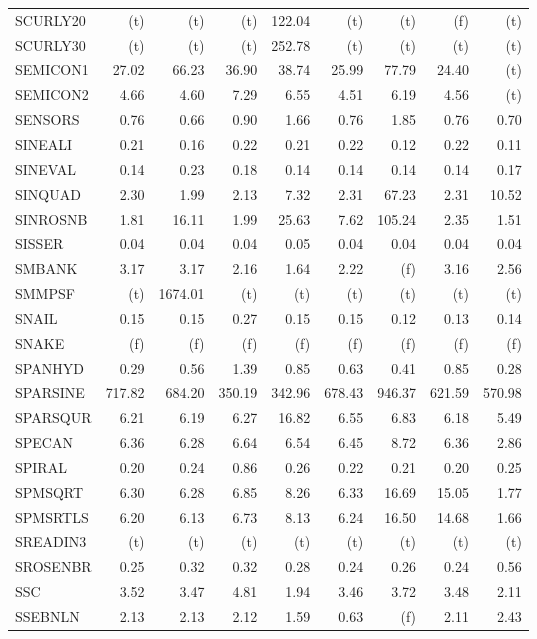 \documentclass[11pt,twoside]{article}
\begin{document}
{\begin{longtable}[c]{|l|r|r|r|r|r|r|r|r|}
SCURLY20 & (t) & (t) & (t) & 122.04 & (t) & (t) & (f) & (t) \\
SCURLY30 & (t) & (t) & (t) & 252.78 & (t) & (t) & (t) & (t) \\
SEMICON1 & 27.02 & 66.23 & 36.90 & 38.74 & 25.99 & 77.79 & 24.40 & (t) \\
SEMICON2 & 4.66 & 4.60 & 7.29 & 6.55 & 4.51 & 6.19 & 4.56 & (t) \\
SENSORS & 0.76 & 0.66 & 0.90 & 1.66 & 0.76 & 1.85 & 0.76 & 0.70 \\
SINEALI & 0.21 & 0.16 & 0.22 & 0.21 & 0.22 & 0.12 & 0.22 & 0.11 \\
SINEVAL & 0.14 & 0.23 & 0.18 & 0.14 & 0.14 & 0.14 & 0.14 & 0.17 \\
SINQUAD & 2.30 & 1.99 & 2.13 & 7.32 & 2.31 & 67.23 & 2.31 & 10.52 \\
SINROSNB & 1.81 & 16.11 & 1.99 & 25.63 & 7.62 & 105.24 & 2.35 & 1.51 \\
SISSER & 0.04 & 0.04 & 0.04 & 0.05 & 0.04 & 0.04 & 0.04 & 0.04 \\
SMBANK & 3.17 & 3.17 & 2.16 & 1.64 & 2.22 & (f) & 3.16 & 2.56 \\
SMMPSF & (t) & 1674.01 & (t) & (t) & (t) & (t) & (t) & (t) \\
SNAIL & 0.15 & 0.15 & 0.27 & 0.15 & 0.15 & 0.12 & 0.13 & 0.14 \\
SNAKE & (f) & (f) & (f) & (f) & (f) & (f) & (f) & (f) \\
SPANHYD & 0.29 & 0.56 & 1.39 & 0.85 & 0.63 & 0.41 & 0.85 & 0.28 \\
SPARSINE & 717.82 & 684.20 & 350.19 & 342.96 & 678.43 & 946.37 & 621.59 & 570.98 \\
SPARSQUR & 6.21 & 6.19 & 6.27 & 16.82 & 6.55 & 6.83 & 6.18 & 5.49 \\
SPECAN & 6.36 & 6.28 & 6.64 & 6.54 & 6.45 & 8.72 & 6.36 & 2.86 \\
SPIRAL & 0.20 & 0.24 & 0.86 & 0.26 & 0.22 & 0.21 & 0.20 & 0.25 \\
SPMSQRT & 6.30 & 6.28 & 6.85 & 8.26 & 6.33 & 16.69 & 15.05 & 1.77 \\
SPMSRTLS & 6.20 & 6.13 & 6.73 & 8.13 & 6.24 & 16.50 & 14.68 & 1.66 \\
SREADIN3 & (t) & (t) & (t) & (t) & (t) & (t) & (t) & (t) \\
SROSENBR & 0.25 & 0.32 & 0.32 & 0.28 & 0.24 & 0.26 & 0.24 & 0.56 \\
SSC & 3.52 & 3.47 & 4.81 & 1.94 & 3.46 & 3.72 & 3.48 & 2.11 \\
SSEBNLN & 2.13 & 2.13 & 2.12 & 1.59 & 0.63 & (f) & 2.11 & 2.43 \\

\end{longtable}}
\end{document}
